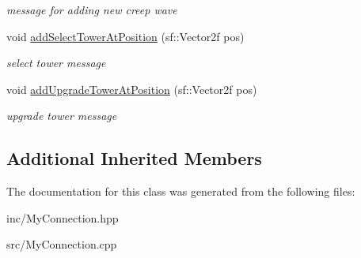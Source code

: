\begin{DoxyCompactItemize}
\begin{DoxyCompactList}\small\item\em message for adding new creep wave \end{DoxyCompactList}\item 
\hypertarget{class_my_connection_a4a418986f88c49b3695fadde4464be01}{void \hyperlink{class_my_connection_a4a418986f88c49b3695fadde4464be01}{add\+Select\+Tower\+At\+Position} (sf\+::\+Vector2f pos)}\label{class_my_connection_a4a418986f88c49b3695fadde4464be01}

\begin{DoxyCompactList}\small\item\em select tower message \end{DoxyCompactList}\item 
\hypertarget{class_my_connection_a3d191d8569155bbdf6cb91fe75e95924}{void \hyperlink{class_my_connection_a3d191d8569155bbdf6cb91fe75e95924}{add\+Upgrade\+Tower\+At\+Position} (sf\+::\+Vector2f pos)}\label{class_my_connection_a3d191d8569155bbdf6cb91fe75e95924}

\begin{DoxyCompactList}\small\item\em upgrade tower message \end{DoxyCompactList}\end{DoxyCompactItemize}
\subsection*{Additional Inherited Members}


The documentation for this class was generated from the following files\+:\begin{DoxyCompactItemize}
\item 
inc/My\+Connection.\+hpp\item 
src/My\+Connection.\+cpp\end{DoxyCompactItemize}
